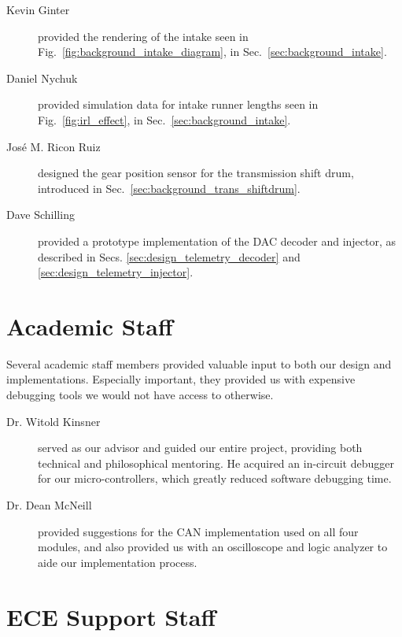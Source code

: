\begin{description}

\item[Kevin Ginter] provided the rendering of the intake seen in Fig.\ \ref{fig:background_intake_diagram}, in Sec.\ \ref{sec:background_intake}.

\item[Daniel Nychuk] provided simulation data for intake runner lengths seen in Fig.\ \ref{fig:irl_effect}, in Sec.\ \ref{sec:background_intake}. 

\item[José M. Ricon Ruiz] designed the gear position sensor for the transmission shift drum, introduced in Sec.\ \ref{sec:background_trans_shiftdrum}.

\item[Dave Schilling] provided a prototype implementation of the DAC decoder and injector, as described in Secs. \ref{sec:design_telemetry_decoder} and \ref {sec:design_telemetry_injector}.

\end{description}

\section*{Academic Staff}

Several academic staff members provided valuable input to both our design and implementations. Especially important, they provided us with expensive debugging tools we would not have access to otherwise.

\begin{description}

\item[Dr. Witold Kinsner] served as our advisor and guided our entire project, providing both technical and philosophical mentoring. He acquired an in-circuit debugger for our micro-controllers, which greatly reduced software debugging time.

\item[Dr. Dean McNeill] provided suggestions for the CAN implementation used on all four modules, and also provided us with an oscilloscope and logic analyzer to aide our implementation process.

\end{description}

\section*{ECE Support Staff}

